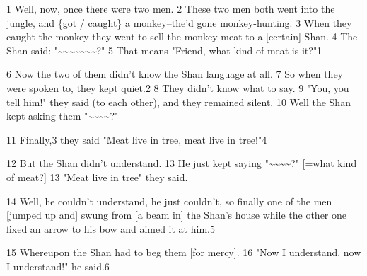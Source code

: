 
1 Well, now, once there were two men. 2 These two men both went into the jungle,
and \{got / caught\} a monkey--the'd gone monkey-hunting. 3 When they caught the
monkey they went to sell the monkey-meat to a [certain] Shan. 4 The Shan said:
"\textasciitilde{}\textasciitilde{}\textasciitilde{}\textasciitilde{}\textasciitilde{}\textasciitilde{}\textasciitilde{}?"
5 That means "Friend, what kind of meat is it?"1

6 Now the two of them didn't know the Shan language at all. 7 So when they were
spoken to, they kept quiet.2 8 They didn't know what to say. 9 "You, you
tell him!" they said (to each other), and they remained silent. 10 Well
the Shan kept asking them "\textasciitilde{}\textasciitilde{}\textasciitilde{}\textasciitilde{}?"

11 Finally,3 they said "Meat live in tree, meat live in tree!"4

12 But the Shan didn't understand. 13 He just kept saying "\textasciitilde{}\textasciitilde{}\textasciitilde{}\textasciitilde{}?"
[=what kind of meat?] 13 "Meat live in tree" they said.

14 Well, he couldn't understand, he just couldn't, so finally one of the men [jumped
up and] swung from [a beam in] the Shan's house while the other one fixed an arrow
to his bow and aimed it at him.5

15 Whereupon the Shan had to beg them [for mercy]. 16 "Now I understand,
now I understand!" he said.6

